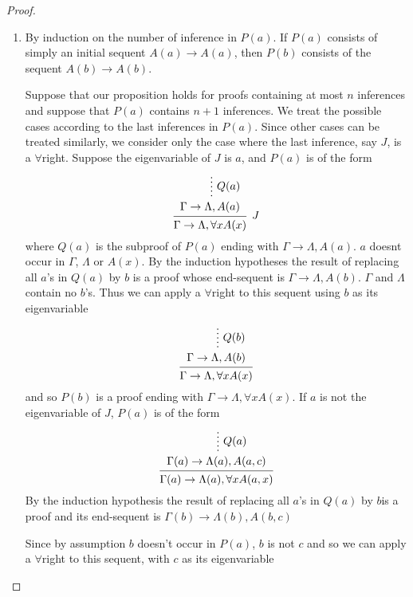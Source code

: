 \documentclass[11pt]{article}
\begin{document}
\begin{proof}
\begin{enumerate}
\item By induction on the number of inference in \(P(a)\). If \(P(a)\) consists
of simply an initial sequent \(A(a)\to A(a)\), then \(P(b)\) consists of the
sequent \(A(b)\to A(b)\).

Suppose that our proposition holds for proofs containing at most \(n\)
inferences and suppose that \(P(a)\) contains \(n+1\) inferences. We treat
the possible cases according to the last inferences in \(P(a)\). Since
other cases can be treated similarly, we consider only the case where the
last inference, say \(J\), is a \(\forall\)right. Suppose the
eigenvariable of \(J\) is \(a\), and \(P(a)\) is of the form
\begin{equation*}
\begin{prooftree}%
\hypo{}
\ellipsis{\(Q(a)\)}{\Gamma\to\Lambda,A(a)}
\infer1[\(J\)]{\Gamma\to\Lambda,\forall xA(x)}
\end{prooftree}
\end{equation*}
where \(Q(a)\) is the subproof of \(P(a)\) ending with
\(\Gamma\to\Lambda,A(a)\). \(a\) doesnt occur in \(\Gamma\), \(\Lambda\) or \(A(x)\). By the
induction hypotheses the result of replacing all \(a\)'s  in \(Q(a)\) by
\(b\) is a proof whose end-sequent is \(\Gamma\to\Lambda,A(b)\). \(\Gamma\) and \(\Lambda\)
contain no \(b\)'s. Thus we can apply a \(\forall\)right to this sequent
using \(b\) as its eigenvariable
\begin{equation*}
\begin{prooftree}%
\hypo{}
\ellipsis{\(Q(b)\)}{\Gamma\to\Lambda,A(b)}
\infer1[]{\Gamma\to\Lambda,\forall xA(x)}
\end{prooftree}
\end{equation*}
and so \(P(b)\) is a proof ending with \(\Gamma\to\Lambda,\forall xA(x)\). If
\(a\) is not the eigenvariable of \(J\), \(P(a)\) is of the form
\begin{equation*}
\begin{prooftree}%
\hypo{}
\ellipsis{\(Q(a)\)}{\Gamma(a)\to\Lambda(a),A(a,c)}
\infer1{\Gamma(a)\to\Lambda(a),\forall xA(a,x)}
\end{prooftree}
\end{equation*}
By the induction hypothesis the result of replacing all \(a\)'s in
\(Q(a)\) by \(b\)is a proof and its end-sequent is
\(\Gamma(b)\to\Lambda(b),A(b,c)\)

Since by assumption \(b\) doesn't occur in \(P(a)\), \(b\) is not \(c\)
and so we can apply a \(\forall\)right to this sequent, with \(c\) as its eigenvariable


\end{enumerate}
\end{proof}
\end{document}
